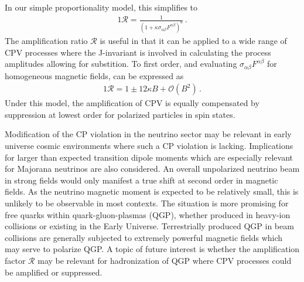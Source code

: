 In our simple proportionality model, this simplifies to
\begin{alignat}{1}
	\label{amp:2} \mathcal{R} = \frac{1}{\left(1+\kappa\sigma_{\alpha\beta}F^{\alpha\beta}\right)^{6}}\,.
\end{alignat}
The amplification ratio $\mathcal{R}$ is useful in that it can be applied to a wide range of CPV processes where the J-invariant is involved in calculating the process amplitudes allowing for substition. To first order, and evaluating $\sigma_{\alpha\beta}F^{\alpha\beta}$ for homogeneous magnetic fields,  can be expressed as
\begin{alignat}{1}
	\label{amp:3} \mathcal{R} = 1\pm12\kappa B+\mathcal{O}(B^{2})\,.
\end{alignat}
Under this model, the amplification of CPV is equally compensated by suppression at lowest order for polarized particles in spin states.

Modification of the CP violation in the neutrino sector may be relevant in early universe cosmic environments where such a CP violation is lacking. Implications for larger than expected transition dipole moments which are especially relevant for Majorana neutrinos are also considered. An overall unpolarized neutrino beam in strong fields would only manifest a true shift at second order in magnetic fields. As the neutrino magnetic moment is expected to be relatively small, this is unlikely to be observable in most contexts. The situation is more promising for free quarks within quark-gluon-plasmas (QGP), whether produced in heavy-ion collisions or existing in the Early Universe. Terrestrially produced QGP in beam collisions are generally subjected to extremely powerful magnetic fields which may serve to polarize QGP. A topic of future interest is whether the amplification factor $\mathcal{R}$ may be relevant for hadronization of QGP where CPV processes could be amplified or suppressed.
